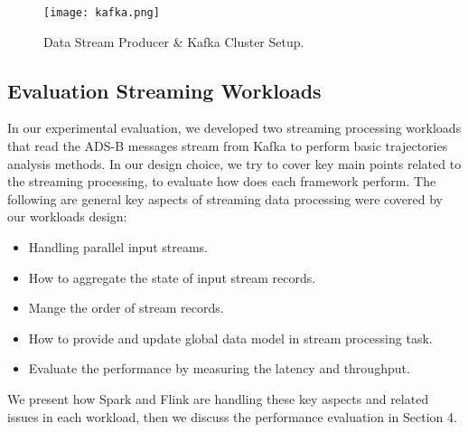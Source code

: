 \documentclass[]{article}
\begin{document}
\begin{figure}[h]
 
  \centering
    \texttt{[image: kafka.png]}
     \caption{Data Stream Producer \& Kafka Cluster Setup.}
\end{figure} 

\subsection{Evaluation Streaming Workloads}
In our experimental evaluation, we developed two streaming processing workloads that read the ADS-B messages stream from Kafka to perform basic trajectories analysis methods. In our design choice, we try to cover key main points related to the streaming processing, to evaluate how  does each framework perform. The following are general key aspects of  streaming data processing were covered by our workloads design: 

\begin{itemize}
\item Handling parallel input streams.
\item How to aggregate the state of input stream records.
\item Mange the order of stream records.
\item How to provide and update global data model in stream processing task.
\item Evaluate the performance by measuring  the latency and throughput.
\end{itemize}
We present how Spark and Flink are handling these key aspects and related issues in each workload, then we discuss the performance evaluation in Section 4.
\end{document}
